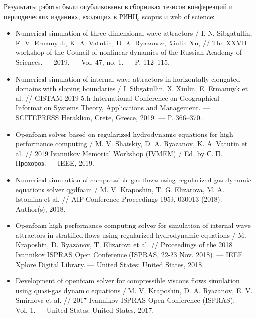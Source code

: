 Результаты работы были опубликованы в сборниках тезисов конференций и периодических изданиях, входящих в РИНЦ, scopus и web of science:

\begin{itemize}

    \item Numerical simulation of three-dimensional wave attractors / I. N. Sibgatullin, E. V. Ermanyuk, K. A. Vatutin, D. A. Ryazanov, Xiulin Xu,  // The XXVII workshop of the Council of nonlinear dynamics of the Russian Academy of Sciences. — 2019. — Vol. 47, no. 1. — P. 112–115.
    
    \item Numerical simulation of internal wave attractors in horizontally elongated domains with sloping boundaries / I. Sibgatullin, X. Xiulin, E. Ermanuyk et al. // GISTAM 2019 5th International Conference on Geographical Information Systems Theory, Applications and Management. — SCITEPRESS Heraklion, Crete, Greece, 2019. — P. 366–370.
    
    \item Openfoam solver based on regularized hydrodynamic equations for high performance computing / M. V. Shatskiy, D. A. Ryazanov, K. A. Vatutin et al. // 2019 Ivannikov Memorial Workshop (IVMEM) / Ed. by С. П. Прохоров. — IEEE, 2019.
    
    \item Numerical simulation of compressible gas flows using regularized gas dynamic equations solver qgdfoam / M. V. Kraposhin, T. G. Elizarova, M. A. Istomina et al. // AIP Conference Proceedings 1959, 030013 (2018). — Author(s), 2018.
    
    \item Openfoam high performance computing solver for simulation of internal wave attractors in stratified flows using regularized hydrodynamic equations / M. Kraposhin, D. Ryazanov, T. Elizarova et al. // Proceedings of the 2018 Ivannikov ISPRAS Open Conference (ISPRAS, 22-23 Nov. 2018). — IEEE Xplore Digital Library. — United States: United States, 2018.
    
    \item Development of openfoam solver for compressible viscous flows simulation using quasi-gas dynamic equations / M. V. Kraposhin, D. A. Ryazanov, E. V. Smirnova et al. // 2017 Ivannikov ISPRAS Open Conference (ISPRAS). — Vol. 1. — United States: United States, 2017.
    
\end{itemize}


